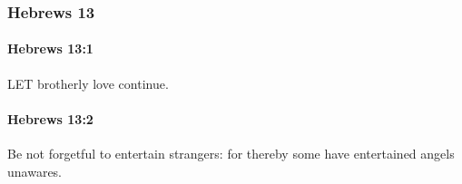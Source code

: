 	\subsubsection{Hebrews 13} %
		\label{HEBREWS-13}
		
		\paragraph{Hebrews 13:1} %
			\label{HEBREWS-13-1}

			LET brotherly love continue.

			\begin{framed}
			\scriptsize
				\begin{compactdesc}
					\item[SBLG] 
				\end{compactdesc}
			\end{framed}

		\paragraph{Hebrews 13:2} %
			\label{HEBREWS-13-2}

			Be not forgetful to entertain strangers: for thereby some have entertained angels unawares.


